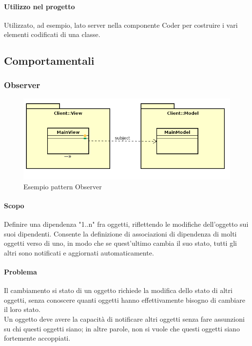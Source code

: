 \documentclass[../PianoDiQualifica.tex]{subfiles}
\begin{document}
				\paragraph{Utilizzo nel progetto\\}
					Utilizzato, ad esempio, lato server nella componente Coder per costruire i vari elementi codificati di una classe.
		\subsection{Comportamentali}
			\subsubsection{Observer}
				\begin{figure}[H] \label{fig:Observer}
					\centering
					\includegraphics[scale=0.6]{Immagini/ObserverEx.png}
					\caption{Esempio pattern Observer}
				\end{figure}
				\paragraph{Scopo\\}
					Definire una dipendenza "1..n" fra oggetti, riflettendo le modifiche dell'oggetto
					sui suoi dipendenti. Consente la definizione di associazioni di dipendenza di molti oggetti verso di uno, in modo che se quest’ultimo cambia il suo stato, tutti gli altri sono notificati e aggiornati automaticamente.
				\paragraph{Problema\\}
					Il cambiamento si stato di un oggetto richiede la modifica dello stato di altri oggetti, senza conoscere quanti oggetti hanno effettivamente bisogno di cambiare il loro stato. \\
					Un oggetto deve avere la capacità di notificare altri oggetti senza fare assunzioni su chi questi oggetti siano; in altre parole, non si vuole che questi oggetti siano fortemente accoppiati.
\end{document}
